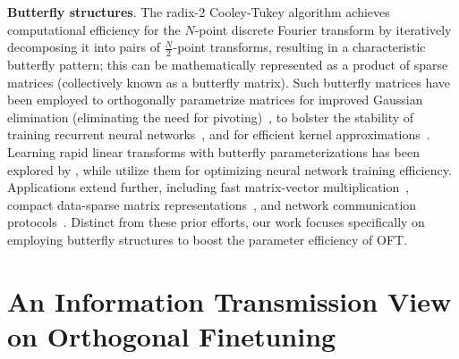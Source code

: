 \textbf{Butterfly structures}. The radix-2 Cooley-Tukey algorithm achieves computational efficiency for the $N$-point discrete Fourier transform by iteratively decomposing it into pairs of $\frac{N}{2}$-point transforms, resulting in a characteristic butterfly pattern; this can be mathematically represented as a product of sparse matrices (collectively known as a butterfly matrix). Such butterfly matrices have been employed to orthogonally parametrize matrices for improved Gaussian elimination (eliminating the need for pivoting)~\cite{parker1995random}, to bolster the stability of training recurrent neural networks~\cite{jing2017tunable}, and for efficient kernel approximations~\cite{munkhoeva2018quadrature}. Learning rapid linear transforms with butterfly parameterizations has been explored by \cite{dao2019learning,dao2019kaleidoscope}, while \cite{chen2022pixelated,dao2022monarch} utilize them for optimizing neural network training efficiency. Applications extend further, including fast matrix-vector multiplication~\cite{michielssen1996multilevel,o2010algorithm}, compact data-sparse matrix representations~\cite{li2015butterfly}, and network communication protocols~\cite{klasing1994broadcasting,li2003linear,rajasingh2016transmission}. Distinct from these prior efforts, our work focuses specifically on employing butterfly structures to boost the parameter efficiency of OFT.

\section{An Information Transmission View on Orthogonal Finetuning}

